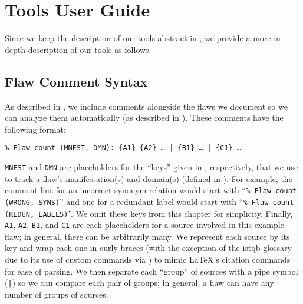 \chapter{Tools User Guide}\label{tools-guide}

Since we keep the description of our tools abstract in ,
we provide a more in-depth description of our tools as follows.

\section{Flaw Comment Syntax}\label{flaw-comment-syntax}
As described in , we include comments alongside the flaws we
document so we can analyze them automatically (as described in
). These comments have the following format:
\begin{displayquote}
    \texttt{\% Flaw count (MNFST, DMN): \{A1\} \{A2\} \dots{} | \{B1\} %
        \dots{} | \{C1\} \dots}
\end{displayquote}
\texttt{MNFST} and \texttt{DMN} are placeholders for the ``keys'' given in
, respectively, that we use to
track a flaw's manifestation(s) and domain(s) (defined in ).
For example, the comment line for an incorrect synonym relation would start
with ``\texttt{\% Flaw count (WRONG, SYNS)}'' and one for a redundant label would
start with ``\texttt{\% Flaw count (REDUN, LABELS)}''. We omit these keys from
this chapter for simplicity. Finally, \texttt{A1}, \texttt{A2}, %
\texttt{B1}, and \texttt{C1} are each placeholders for a source involved in
this example flaw; in general, there can be arbitrarily many. We represent
each source by its \BibTeX{} key and wrap each one in curly braces (with
the exception of the \acs{istqb} glossary due to its use of custom commands
via ) to mimic \LaTeX{}'s citation commands for ease of
parsing. We then separate each ``group'' of sources with a pipe symbol
(\texttt{|}) so we can compare each pair of groups; in general, a flaw can
have any number of groups of sources.

